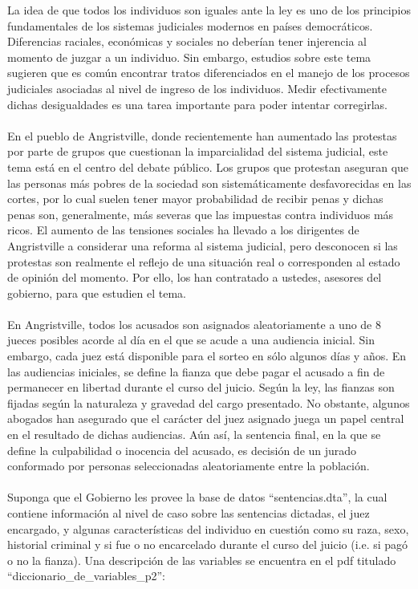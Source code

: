 \documentclass[a4paper]{article}
\begin{document}
La idea de que todos los individuos son iguales ante la ley es uno de los principios fundamentales de los sistemas judiciales modernos en países democráticos. Diferencias raciales, económicas y sociales no deberían tener injerencia al momento de juzgar a un individuo. Sin embargo, estudios sobre este tema sugieren que es común encontrar tratos diferenciados en el manejo de los procesos judiciales asociadas al nivel de ingreso de los individuos. Medir efectivamente dichas desigualdades es una tarea importante para poder intentar corregirlas. 
\\\\
En el pueblo de Angristville, donde recientemente han aumentado las protestas por parte de grupos que cuestionan la imparcialidad del sistema judicial, este tema está en el centro del debate público. Los grupos que protestan aseguran que las personas más pobres de la sociedad son sistemáticamente desfavorecidas en las cortes, por lo cual suelen tener mayor probabilidad de recibir penas y dichas penas son, generalmente, más severas que las impuestas contra individuos más ricos. El aumento de las tensiones sociales ha llevado a los dirigentes de Angristville a considerar una reforma al sistema judicial, pero desconocen si las protestas son realmente el reflejo de una situación real o corresponden al estado de opinión del momento. Por ello, los han contratado a ustedes, asesores del gobierno, para que estudien el tema.
\\\\
En Angristville, todos los acusados son asignados aleatoriamente a uno de 8 jueces posibles acorde al día en el que se acude a una audiencia inicial. Sin embargo, cada juez está disponible para el sorteo en sólo algunos días y años. En las audiencias iniciales, se define la fianza que debe pagar el acusado a fin de permanecer en libertad durante el curso del juicio. Según la ley, las fianzas son fijadas según la naturaleza y gravedad del cargo presentado. No obstante, algunos abogados han asegurado que el carácter del juez asignado juega un papel central en el resultado de dichas audiencias. Aún así, la sentencia final, en la que se define la culpabilidad o inocencia del acusado, es decisión de un jurado conformado por personas seleccionadas aleatoriamente entre la población. 
\\\\
Suponga que el Gobierno les provee la base de datos ``sentencias.dta'', la cual contiene información al nivel de caso sobre las sentencias dictadas, el juez encargado, y algunas características del individuo en cuestión como su raza, sexo, historial criminal y si fue o no encarcelado durante el curso del juicio (i.e. si pagó o no la fianza). Una descripción de las variables se encuentra en el pdf titulado ``diccionario\_de\_variables\_p2'':
\end{document}
